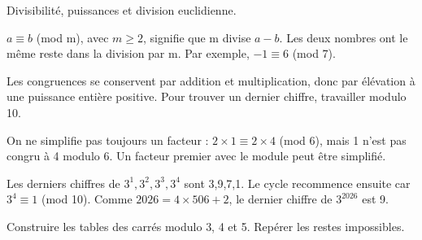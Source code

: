 \documentclass[11pt]{article}
\begin{document}
Divisibilité, puissances et division euclidienne.\par
{}
\(a \equiv  b\) (mod m), avec \(m \geq  2\), signifie que m divise \(a - b\). Les deux nombres ont le même reste dans la division par m. Par exemple, −\(1 \equiv  6\) (mod 7).\par
Les congruences se conservent par addition et multiplication, donc par élévation à une puissance entière positive. Pour trouver un dernier chiffre, travailler modulo 10.\par
On ne simplifie pas toujours un facteur : \(2 \times  1 \equiv  2 \times  4\) (mod 6), mais 1 n’est pas congru à 4 modulo 6. Un facteur premier avec le module peut être simplifié.\par
{}
Les derniers chiffres de \(3^{1}, 3^{2}, 3^{3}, 3^{4}\) sont 3,9,7,1. Le cycle recommence ensuite car \(3^{4} \equiv  1\) (mod 10). Comme \(2026 = 4 \times  506 + 2\), le dernier chiffre de \(3^{2026}\) est 9.\par
{}
Construire les tables des carrés modulo 3, 4 et 5. Repérer les restes impossibles.\par
\end{document}
